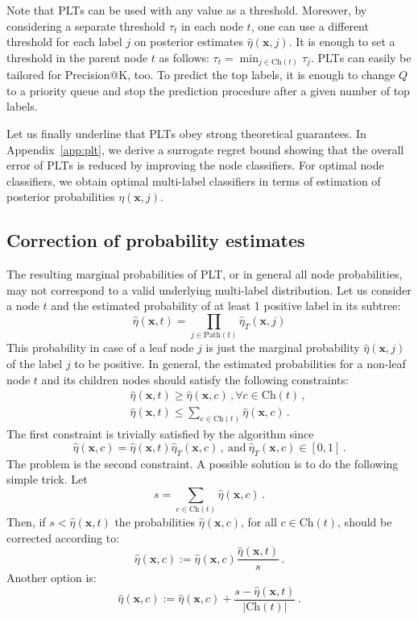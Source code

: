 \documentclass{article}
\newcommand{\Algo}[1]{\textsc{#1}}
\renewcommand{\vec}[1]{\boldsymbol{#1}}
\newcommand{\bx}{\vec{x}}
\newcommand{\heta}{\hat{\eta}}
\newcommand{\Path}[1]{\mathrm{Path}(#1)}
\newcommand{\Children}[1]{\mathrm{Ch}(#1)}
\newcommand{\sectionBefore}{-0pt}
\newcommand{\sectionAfter}{-0pt}
\begin{document}

Note that \Algo{PLT}s can be used with any value as a threshold. Moreover, by considering a separate threshold $\tau_t$ in each node $t$, one can use a different threshold for each label $j$ on posterior estimates $\hat\eta(\bx,j)$. It is enough to set a threshold in the parent node $t$ as follows:
$\tau_t = \min_{j \in \Children{t}} \tau_j$. 
%
\Algo{PLT}s can easily be tailored for Precision@K, too. To predict the top labels, it is enough to change $Q$ to a priority queue and stop the prediction procedure after a given number of top labels. %

Let us finally underline that  \Algo{PLT}s obey strong theoretical guarantees. In  Appendix~\ref{app:plt}, we derive a surrogate regret bound showing that the overall error of \Algo{PLT}s is reduced by improving the node classifiers. For optimal node classifiers, we obtain optimal multi-label classifiers in terms of estimation of posterior probabilities $\eta(\bx,j)$.


\vspace{\sectionBefore}
\subsection{Correction of probability estimates}
\label{sec:online_PLTs}
\vspace{\sectionAfter}

The resulting marginal probabilities of PLT, or in general all node probabilities, may not correspond to a valid underlying multi-label distribution. Let us consider a node $t$ and the estimated probability of at least 1 positive label in its subtree: 
$$
\heta(\bx, t) = \prod_{j \in \Path{t}} \heta_T(\bx, j)
$$
This probability in case of a leaf node $j$ is just the marginal probability $\heta(\bx, j)$ of the label $j$ to be positive.
In general, the estimated probabilities for a non-leaf node $t$ and its children nodes should satisfy the following constraints: 
\begin{eqnarray*}
&& \heta(\bx, t)  \ge \heta(\bx, c)\,, \forall c \in \Children{t}\,, \\
&& \heta(\bx, t)  \le \sum_{c \in \Children{t}}  \heta(\bx, c) \,. 
\end{eqnarray*}
The first constraint is trivially satisfied by the algorithm since 
$$
\heta(\bx, c) = \heta(\bx, t) \heta_T(\bx, c)\,,\mathrm{~and~}  \heta_T(\bx, c) \in [0,1]\,.
$$ 
The problem is the second constraint. A possible solution is to do the following simple trick. Let 
$$
s = \sum_{c \in \Children{t}} \heta(\bx, c) \,.
$$
Then, if $s < \heta(\bx, t)$ the probabilities $\heta(\bx, c)$, for all $c \in \Children{t}$, should be corrected according to:
$$
\heta(\bx, c) := \heta(\bx, c) \frac{\heta(\bx, t)}{s}\,.
$$
Another option is:
$$
\heta(\bx, c) := \heta(\bx, c) + \frac{s - \heta(\bx, t)}{|\Children{t}|}\,.
$$
\end{document}
